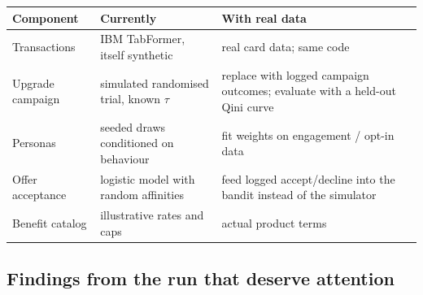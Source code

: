 \documentclass[11pt,a4paper]{article}
\begin{document}
\begin{center}
\small
\begin{tabularx}{\linewidth}{@{}p{3cm}p{4.6cm}X@{}}
\toprule
\textbf{Component} & \textbf{Currently} & \textbf{With real data}\\
\midrule
Transactions & IBM TabFormer, itself synthetic & real card data; same code\\
Upgrade campaign & simulated randomised trial, known $\tau$ & replace with logged campaign outcomes; evaluate with a held-out Qini curve\\
Personas & seeded draws conditioned on behaviour & fit weights on engagement / opt-in data\\
Offer acceptance & logistic model with random affinities & feed logged accept/decline into the bandit instead of the simulator\\
Benefit catalog & illustrative rates and caps & actual product terms\\
\bottomrule
\end{tabularx}
\end{center}

\subsection{Findings from the run that deserve attention}
\end{document}
